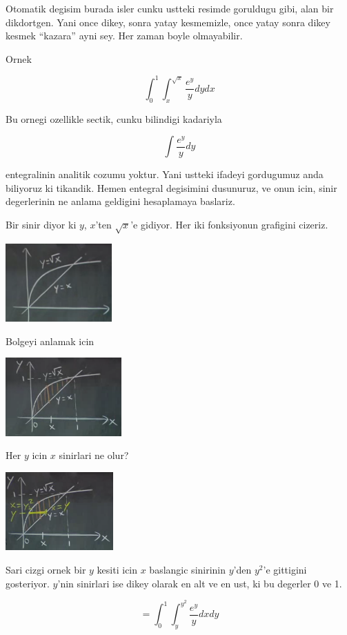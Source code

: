 \documentclass[12pt,fleqn]{article}
\begin{document}
Otomatik degisim burada isler cunku ustteki resimde goruldugu gibi, alan
bir dikdortgen. Yani once dikey, sonra yatay kesmemizle, once yatay sonra
dikey kesmek ``kazara'' ayni sey. Her zaman boyle olmayabilir. 

Ornek 

\[ \int_0^1 \int_x^{\sqrt{x}} \frac{e^y}{y} dy dx \]

Bu ornegi ozellikle sectik, cunku bilindigi kadariyla 

\[ \int \frac{e^y}{y} dy \]

entegralinin analitik cozumu yoktur. Yani ustteki ifadeyi gordugumuz anda
biliyoruz ki tikandik. Hemen entegral degisimini dusunuruz, ve onun icin,
sinir degerlerinin ne anlama geldigini hesaplamaya baslariz. 

Bir sinir diyor ki $y$, $x$'ten $\sqrt{x}$'e gidiyor. Her iki fonksiyonun
grafigini cizeriz. 

\includegraphics[height=3cm]{16_13.png}

Bolgeyi anlamak icin

\includegraphics[height=3cm]{16_14.png}

Her $y$ icin $x$ sinirlari ne olur? 

\includegraphics[height=3cm]{16_15.png}

Sari cizgi ornek bir $y$ kesiti icin $x$ baslangic sinirinin $y$'den
$y^2$'e gittigini gosteriyor. $y$'nin sinirlari ise dikey olarak en alt ve
en ust, ki bu degerler 0 ve 1. 

\[ = \int_0^1 \int_y^{y^2}  \frac{e^y}{y} dx dy \]
\end{document}
